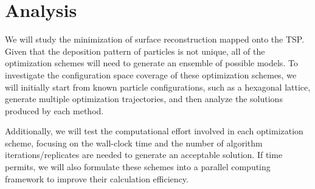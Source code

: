 \documentclass[10pt,twocolumn,notitlepage]{article}
\begin{document}
\section{Analysis}
We will study the minimization of surface reconstruction mapped onto the TSP.  Given that the deposition pattern of particles is not unique, all of the optimization schemes will need to generate an ensemble of possible models.  To investigate the configuration space coverage of these optimization schemes, we will initially start from known particle configurations, such as a hexagonal lattice, generate multiple optimization trajectories, and then analyze the solutions produced by each method.

Additionally, we will test the computational effort involved in each optimization scheme, focusing on the wall-clock time and the number of algorithm iterations/replicates are needed to generate an acceptable solution.  If time permits, we will also formulate these schemes into a parallel computing framework to improve their calculation efficiency.


\makeatletter
\newcommand{\adjustmybblparameters}{\setlength{\itemsep}{0ex}\setlength{\parsep}{0pt}}
\let\ORIGINALlatex@openbib@code=\@openbib@code
\renewcommand{\@openbib@code}{\ORIGINALlatex@openbib@code\adjustmybblparameters}
\makeatother



\end{document}
